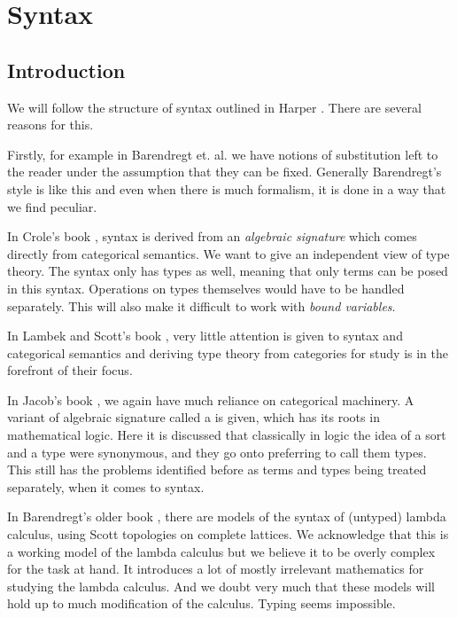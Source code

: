 
\section{Syntax}

\subsection{Introduction}

We will follow the structure of syntax outlined in Harper \cite{harper_2016}. There are several reasons for this. 

Firstly, for example in Barendregt et. al. \cite{BarendregtHenk2013Lcwt} we have notions of substitution left to the reader under the assumption that they can be fixed. Generally Barendregt's style is like this and even when there is much formalism, it is done in a way that we find peculiar.

In Crole's book \cite{CroleRoyL1993Cft}, syntax is derived from an \textit{algebraic signature} which comes directly from categorical semantics. We want to give an independent view of type theory. The syntax only has types as well, meaning that only terms can be posed in this syntax. Operations on types themselves would have to be handled separately. This will also make it difficult to work with \textit{bound variables}.

In Lambek and Scott's book \cite{LambekJ1986Itho}, very little attention is given to syntax and categorical semantics and deriving type theory from categories for study is in the forefront of their focus.

In Jacob's book \cite{JacobsCLTT}, we again have much reliance on categorical machinery. A variant of algebraic signature called a  is given, which has its roots in mathematical logic. Here it is discussed that classically in logic the idea of a sort and a type were synonymous, and they go onto preferring to call them types. This still has the problems identified before as terms and types being treated separately, when it comes to syntax.

In Barendregt's older book \cite{barendregt1984lambda}, there are models of the syntax of (untyped) lambda calculus, using Scott topologies on complete lattices. We acknowledge that this is a working model of the lambda calculus but we believe it to be overly complex for the task at hand. It introduces a lot of mostly irrelevant mathematics for studying the lambda calculus. And we doubt very much that these models will hold up to much modification of the calculus. Typing seems impossible.

